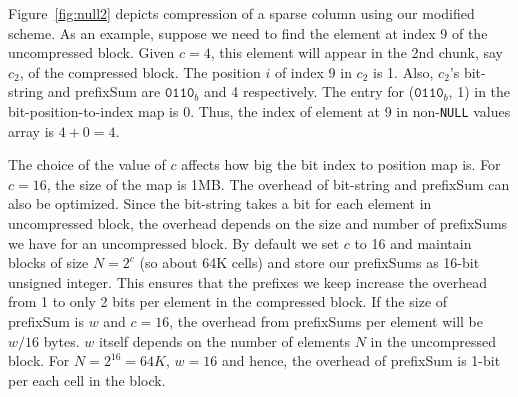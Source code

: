 




Figure~\ref{fig:null2} depicts compression of a sparse column using our modified scheme. As an example, suppose we need to find the element at index 9 of the uncompressed block. Given $c=4$, this element will appear in the 2nd chunk, say $c_2$, of the compressed block. The position $i$ of index 9 in $c_2$ is 1. Also, $c_2$'s bit-string and prefixSum are $\texttt{0110}_b$ and 4 respectively. The entry for ($\texttt{0110}_b$, 1) in the bit-position-to-index map is 0. Thus, the index of element at 9 in non-\texttt{NULL} values array is $4+0 = 4$.

The choice of the value of $c$ affects how big the bit index to position map is. For $c = 16$, the size of the map is 1MB. The overhead of bit-string and prefixSum can also be optimized. Since the bit-string takes a bit for each element in uncompressed block, the overhead depends on the size and number of prefixSums we have for an uncompressed block. By default we set $c$ to 16 and maintain blocks of size $N=2^c$ (so about 64K cells) and store our prefixSums as 16-bit unsigned integer. This ensures that the prefixes we keep increase the overhead from 1 to only 2 bits per element in the compressed block. If the size of prefixSum is $w$ and $c=16$, the overhead from prefixSums per element will be $w/16$ bytes. $w$ itself depends on the number of elements $N$ in the uncompressed block. For $N=2^{16}=64K$, $w=16$ and hence, the overhead of prefixSum is 1-bit per each cell in the block.

